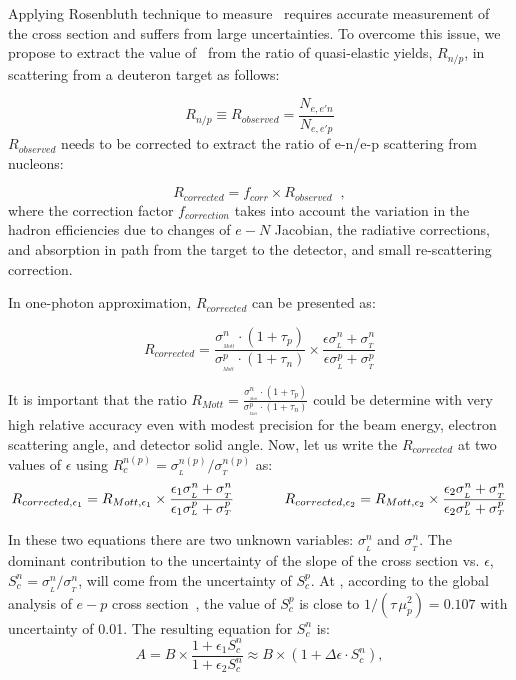 Applying Rosenbluth technique to measure \gen~requires accurate measurement of the cross section  and suffers from large uncertainties. 
To overcome this issue, we propose to extract the value of \gen~from the ratio of quasi-elastic yields, $R_{n/p}$, in scattering from a deuteron target as follows: 

\begin{equation}
R_{n/p} \equiv R_{observed} = \frac{N_{e,e'n}}{N_{e,e'p}}
\label{eq:1}
\end{equation}
$R_{observed}$ needs to be corrected to extract the ratio of e-n/e-p scattering from nucleons:

\begin{equation}
R_{corrected} = f_{corr} \times R_{observed} \;\; ,
\label{eq:2}
\end{equation}
where the correction factor $f_{correction}$ takes into account the variation in the hadron efficiencies due to changes of $e-N$ Jacobian, the radiative corrections, and absorption in path
from the target to the detector, and small re-scattering correction.

In one-photon approximation, $R_{corrected}$ can be presented as: 

\begin{equation}
R_{corrected} = \frac {\sigma_{_{_{Mott}}}^n \cdot (1+\tau_p)}{\sigma_{_{_{Mott}}}^p \cdot (1+\tau_n)} \times \frac{\epsilon \sigma_{_L}^n + \sigma_{_T}^n}{\epsilon \sigma_{_L}^p + \sigma_{_T}^p}
\end{equation}

It is important that the ratio $R_{Mott} = \frac {\sigma_{_{_{Mott}}}^n \cdot (1+\tau_p)}{\sigma_{_{_{Mott}}}^p \cdot (1+\tau_n)}$ could be determine with very high relative accuracy even with modest precision for the beam energy, electron scattering angle, and detector solid angle. 
Now, let us write the $R_{corrected}$ at two values of $\epsilon$ using $R_c^{n(p)} = \sigma_{_L}^{n(p)}/ \sigma_{_T}^{n(p)}$ as:
\begin{equation*}
R_{{corrected},\epsilon_1} = R_{Mott,\epsilon_1} \times \frac{\epsilon_1 \sigma_{_L}^n + \sigma_{_T}^n}{\epsilon_1 \sigma_{_L}^p + \sigma_{_T}^p}
\hskip .5 in
R_{{corrected},\epsilon_2} = R_{Mott,\epsilon_2} \times \frac{\epsilon_2 \sigma_{_L}^n + \sigma_{_T}^n}{\epsilon_2 \sigma_{_L}^p + \sigma_{_T}^p}
\end{equation*}

In these two equations there are two unknown variables: $\sigma_{_L}^n$ and $\sigma_{_T}^n$.
The dominant contribution to the uncertainty of the slope of the cross section vs. $\epsilon$,  
$S_c^n = \sigma_{_L}^n/ \sigma_{_T}^n$, will come from the uncertainty of $S_c^p$.
At  \gevcsq, according to the global analysis of $e-p$ cross section~\cite{Christy2020ab}, the value of $S_c^p$ is close to $1/(\tau \, \mu_p^2) = 0.107$ with uncertainty of 0.01.
The resulting equation for $S_c^n$ is:
\begin{equation*}
A = B \times \frac{1 + \epsilon_1 S_c^n}{1 + \epsilon_2 S_c^n} \approx B \times (1 +  \Delta \epsilon \cdot S_c^n),
\end{equation*}

